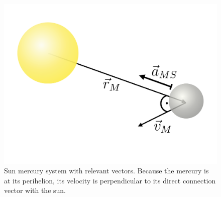 \documentclass[12pt, UK english]{iopart}
\begin{document}
%
\begin{figure}[htb]
	\centering
	\includegraphics[width=.4\textwidth]{figs/sun_merc.pdf}
	\caption{\label{fig:sun_merc}%
		Sun mercury system with relevant vectors.
		Because the mercury is at its perihelion, its velocity is perpendicular to its direct connection vector with the sun.%
	}
\end{figure}
%
\end{document}
